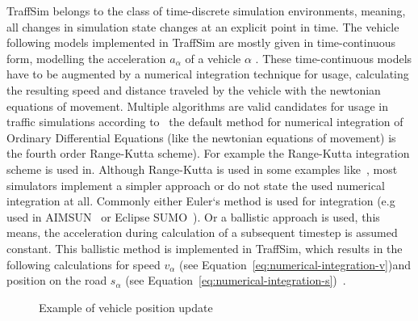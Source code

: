             TraffSim belongs to the class of time-discrete simulation environments, meaning, all changes in simulation state changes at an explicit point in time.
            The vehicle following models implemented in TraffSim are mostly given in time-continuous form, modelling the acceleration $a_\alpha$ of a vehicle $\alpha$ \cite{TraffSimDoku}.
            These time-continuous models have to be augmented by a numerical integration technique for usage, calculating the resulting speed and distance traveled by the vehicle with the newtonian equations of movement.
            Multiple algorithms are valid candidates for usage in traffic simulations according to~\cite{treiber2015comparing} the default method for numerical integration of Ordinary Differential Equations (like the newtonian equations of movement) is the fourth order Range-Kutta scheme).
            For example the Range-Kutta integration scheme is used in.
            Although Range-Kutta is used in some examples like~\cite{kaupuvzs2004applications, shamoto2011car}, most simulators implement a simpler approach or do not state the used numerical integration at all\cite{treiber2015comparing}.
            Commonly either Euler`s method is used for integration (e.g used in AIMSUN~\cite{casas2010traffic} or Eclipse SUMO~\cite{Behrisch2011SUMOS}).
            Or a ballistic approach is used, this means, the acceleration during calculation of a subsequent timestep is assumed constant.
            This ballistic method is implemented in TraffSim, which results in the following calculations for speed $v_\alpha$ (see Equation~\ref{eq:numerical-integration-v})and position on the road $s_\alpha$ (see Equation~\ref{eq:numerical-integration-s})~\cite{TraffSimDoku}.

            \begin{figure}
                \centering
                \caption{Example of vehicle position update}
                \label{fig:traffsim-veh-pos-update}
            \end{figure}

